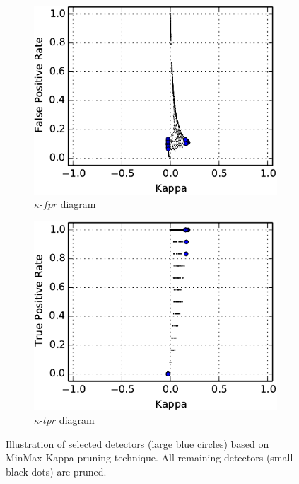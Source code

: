 \begin{figure}[tbh]
    \centering
    \begin{adjustbox}{minipage=\linewidth,scale=0.8}
    \begin{subfigure}[b]{\columnwidth}
        \centering
        \includegraphics[width=\linewidth]{figs/Kappa-fpr-selected-crop}
        \caption{$\kappa$-$fpr$ diagram}
        \label{fig:MinMax-Kappa-fpr}
    \vspace{0.7cm}
    \end{subfigure}
    \begin{subfigure}[b]{\columnwidth}
        \centering
        \includegraphics[width=\linewidth]{figs/Kappa-tpr-selected-crop}
        \caption{$\kappa$-$tpr$ diagram}
        \label{fig:MinMax-Kappa-tpr}
    \end{subfigure}
    \caption{Illustration of selected detectors (large blue circles) based on MinMax-Kappa pruning technique. All remaining detectors (small black dots) are pruned.}
    \label{fig:MinMax-Kappa-fpr-tpr}
    \end{adjustbox}
\end{figure}

